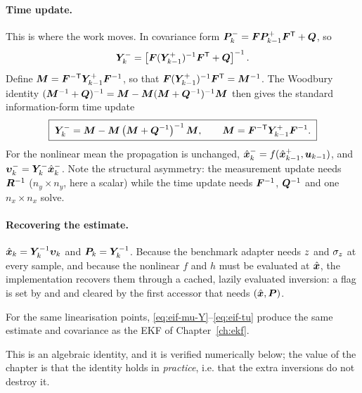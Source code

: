 \paragraph{Time update.} This is where the work moves. In covariance form
$\bm{P}^{-}_k = \bm{F}\bm{P}^{+}_{k-1}\bm{F}^{\mathsf{T}}+\bm{Q}$, so
\begin{equation}
\bm{Y}^-_k = \left[\bm{F}(\bm{Y}^+_{k-1})^{-1}\bm{F}^{\mathsf{T}} + \bm{Q}\right]^{-1} .
\label{eq:eif-tu-naive}
\end{equation}
Define $\bm{M} = \bm{F}^{-\mathsf{T}}\bm{Y}^+_{k-1}\bm{F}^{-1}$, so that
$\bm{F}(\bm{Y}^+_{k-1})^{-1}\bm{F}^{\mathsf{T}} = \bm{M}^{-1}$. The Woodbury identity
$(\bm{M}^{-1}+\bm{Q})^{-1} = \bm{M} - \bm{M}(\bm{M}+\bm{Q}^{-1})^{-1}\bm{M}$ then gives the standard information-form
time update~\cite[\S6.3]{andersonmoore1979}
\begin{equation}
\boxed{\;\bm{Y}^-_k = \bm{M} - \bm{M}\left(\bm{M} + \bm{Q}^{-1}\right)^{-1}\bm{M}, \qquad
 \bm{M} = \bm{F}^{-\mathsf{T}}\bm{Y}^+_{k-1}\bm{F}^{-1} .\;}
\label{eq:eif-tu}
\end{equation}
For the nonlinear mean the propagation is unchanged, $\hat{\bm{x}}^{-}_k = f(\hat{\bm{x}}^{+}_{k-1},\bm{u}_{k-1})$,
and $\bm\upsilon^-_k = \bm{Y}^-_k\hat{\bm{x}}^{-}_k$. Note the structural asymmetry: the measurement
update needs $\bm{R}^{-1}$ ($n_y\times n_y$, here a scalar) while the time update needs $\bm{F}^{-1}$,
$\bm{Q}^{-1}$ and one $n_x\times n_x$ solve.

\paragraph{Recovering the estimate.} $\hat{\bm{x}}_k = \bm{Y}_k^{-1}\bm\upsilon_k$ and $\bm{P}_k=\bm{Y}_k^{-1}$.
Because the benchmark adapter needs $z$ and $\sigma_z$ at every sample, and because the
nonlinear $f$ and $h$ must be evaluated at $\hat{\bm{x}}$, the implementation recovers them through a
cached, lazily evaluated inversion: a  flag is set by  and
 and cleared by the first accessor that needs $(\hat{\bm{x}},\bm{P})$.

\begin{proposition}\label{prop:eif-equiv}
For the same linearisation points, \eqref{eq:eif-mu-Y}--\eqref{eq:eif-tu} produce the same
estimate and covariance as the EKF of Chapter~\ref{ch:ekf}.
\end{proposition}
This is an algebraic identity, and it is verified numerically below; the value of the chapter
is that the identity holds in \emph{practice}, i.e. that the extra inversions do not destroy
it.

